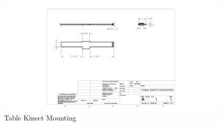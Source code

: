 \documentclass[oneside,final,a4paper]{report}
\begin{document}
\begin{figure}[hbt]
 \centering
 \includegraphics[scale=0.65]{Drawing_Table}
 \caption{Table Kinect Mounting}
\end{figure}
\end{document}
